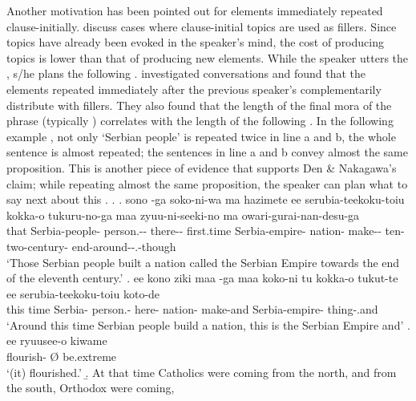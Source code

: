 Another motivation has been pointed out for  elements immediately repeated clause-initially.
 discuss cases where clause-initial topics are used as fillers.
Since topics have already been evoked in the speaker's mind, the cost of producing topics is lower than that of producing new elements.
While the speaker utters the ,
s/he plans the following .
 investigated conversations and found that the  elements repeated immediately after the previous speaker's 
complementarily distribute with fillers.
They also found that the length of the final mora of the  phrase (typically ) correlates with the length of the following 
\cite[see also][]{watanabeden10}.
In the following example \Next,
not only `Serbian people' is repeated twice in line a and b,
the whole sentence is almost repeated;
the sentences in line a and b convey almost the same proposition.
This is another piece of evidence that supports Den \& Nakagawa's claim;
while repeating almost the same proposition,
the speaker can plan what to say next about this .
%
\ex.
 \ag. sono  -ga soko-ni-wa ma hazimete ee serubia-teekoku-toiu kokka-o tukuru-no-ga maa zyuu-ni-seeki-no ma owari-gurai-nan-desu-ga \\
 	that Serbia-people- person.-- there--  first.time  Serbia-empire- nation- make--  ten-two-century-  end-around--.-though \\
	`Those Serbian people built a nation called the Serbian Empire towards the end of the eleventh century.'
 \bg. ee kono ziki maa  -ga maa koko-ni tu kokka-o tukut-te ee serubia-teekoku-toiu koto-de \\
 	 this time  Serbia- person.-  here-  nation- make-and  Serbia-empire- thing-.and \\
	`Around this time Serbian people build a nation, this is the Serbian Empire and'
 \bg. ee ryuusee-o \EM{\O} kiwame \\
 		 flourish- {\O} be.extreme \\
	`(it) flourished.'
 \b. At that time Catholics were coming from the north, and from the south,  Orthodox were coming,
